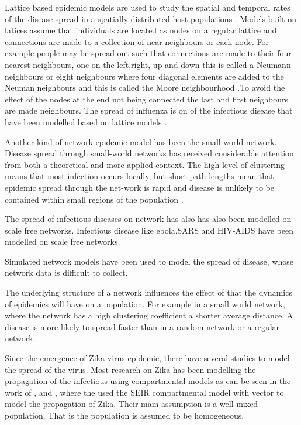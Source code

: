Lattice based epidemic models are used to study the spatial and temporal rates of the disease spread in  a spatially distributed host populations \citep{rhodes1997epidemic}. Models built on latices assume that individuals are located as nodes on a regular lattice and connections are made to a collection of near neighbours or each node. For example people may be spread out such that connections are made to their four nearest neighbours, one on the left,right, up and down this is called a Neumann neighbours  or eight neighbours where four diagonal elements are added to the Neuman neighbours and this is called the Moore neighbourhood \citep{lloyd2006infection}.To avoid the effect of the nodes at the end not being connected the last and first neighbours are made neighbours. The spread of influenza is on of the infectious disease that have been modelled based on lattice models \cite{liccardo2013lattice}. 

Another kind of network epidemic model has been the small world network. Disease spread through small-world networks has received considerable attention from both a theoretical and more applied context. The high level of clustering means that most infection occurs locally, but short path lengths mean that epidemic spread through the net-work is rapid and disease is unlikely to be contained within small regions of the population \citep{watts1998collective}.

The spread of infectious diseases on network has also has also been modelled on scale free networks. Infectious disease like ebola,SARS and HIV-AIDS have been modelled on scale free networks. \citep{morita2016six}


Simulated network models have been used to model the spread of disease, whose network data is difficult to collect.


 The underlying structure of a network influences  the effect of that the dynamics of epidemics will have on a population. For example in a small world network, where the network has a high clustering coefficient a shorter average distance. A disease is more likely to spread faster than in a random network or a regular network.


Since the emergence of Zika virus epidemic, there have several studies to model the spread of the virus. Most research on Zika has been modelling the propagation of the infectious using compartmental models as can be seen in the work of \cite{1}, \cite{2} and \cite{3}, where the used the SEIR compartmental model with vector to model the propagation of Zika. Their main assumption is a well mixed population. That is the population is assumed to be homogeneous.
 
